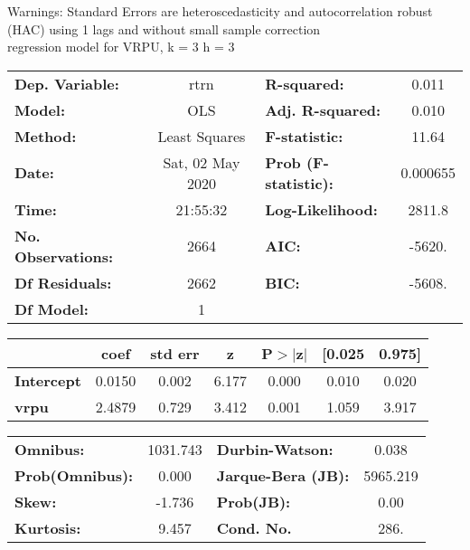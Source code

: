 Warnings: \newline
 [1] Standard Errors are heteroscedasticity and autocorrelation robust (HAC) using 1 lags and without small sample correction\\ 

regression model for VRPU, k = 3 h = 3\begin{center}
\begin{tabular}{lclc}
\toprule
\textbf{Dep. Variable:}    &       rtrn       & \textbf{  R-squared:         } &     0.011   \\
\textbf{Model:}            &       OLS        & \textbf{  Adj. R-squared:    } &     0.010   \\
\textbf{Method:}           &  Least Squares   & \textbf{  F-statistic:       } &     11.64   \\
\textbf{Date:}             & Sat, 02 May 2020 & \textbf{  Prob (F-statistic):} &  0.000655   \\
\textbf{Time:}             &     21:55:32     & \textbf{  Log-Likelihood:    } &    2811.8   \\
\textbf{No. Observations:} &        2664      & \textbf{  AIC:               } &    -5620.   \\
\textbf{Df Residuals:}     &        2662      & \textbf{  BIC:               } &    -5608.   \\
\textbf{Df Model:}         &           1      & \textbf{                     } &             \\
\bottomrule
\end{tabular}
\begin{tabular}{lcccccc}
                   & \textbf{coef} & \textbf{std err} & \textbf{z} & \textbf{P$> |$z$|$} & \textbf{[0.025} & \textbf{0.975]}  \\
\midrule
\textbf{Intercept} &       0.0150  &        0.002     &     6.177  &         0.000        &        0.010    &        0.020     \\
\textbf{vrpu}      &       2.4879  &        0.729     &     3.412  &         0.001        &        1.059    &        3.917     \\
\bottomrule
\end{tabular}
\begin{tabular}{lclc}
\textbf{Omnibus:}       & 1031.743 & \textbf{  Durbin-Watson:     } &    0.038  \\
\textbf{Prob(Omnibus):} &   0.000  & \textbf{  Jarque-Bera (JB):  } & 5965.219  \\
\textbf{Skew:}          &  -1.736  & \textbf{  Prob(JB):          } &     0.00  \\
\textbf{Kurtosis:}      &   9.457  & \textbf{  Cond. No.          } &     286.  \\
\bottomrule
\end{tabular}
\end{center}

